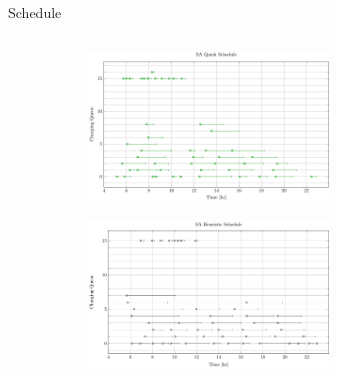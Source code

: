 \documentclass[aspectratio=169,dvipsnames]{beamer}
\begin{document}
\begin{frame}[label={sec:org81d817a}]{Schedule}
\begin{columns}
\begin{column}{0.5\columnwidth}
\begin{figure}
\begin{subfigure}[t]{\textwidth}
\centering
    \includegraphics[width=0.7\textwidth]{img/sa-pap-paper-good/schedule-sa-quick}
\end{subfigure}
\begin{subfigure}[t]{\textwidth}
\centering
    \includegraphics[width=0.7\textwidth]{img/sa-pap-paper-good/schedule-sa-heuristic}
\end{subfigure}
\end{figure}
\end{column}
\end{columns}
\end{frame}
\end{document}

